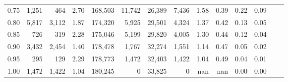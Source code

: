 \begin{tabular}{rrrrrrrrrrrrrr}
0.75 &   1,251 &    464 &    2.70 &  168,503 &   11,742 &  26,389 &   7,436 &  1.58 &  0.39 &  0.22 &      0.09 \\
0.80 &   5,817 &  3,112 &    1.87 &  174,320 &    5,925 &  29,501 &   4,324 &  1.37 &  0.42 &  0.13 &      0.05 \\
0.85 &     726 &    319 &    2.28 &  175,046 &    5,199 &  29,820 &   4,005 &  1.30 &  0.44 &  0.12 &      0.04 \\
0.90 &   3,432 &  2,454 &    1.40 &  178,478 &    1,767 &  32,274 &   1,551 &  1.14 &  0.47 &  0.05 &      0.02 \\
0.95 &     295 &    129 &    2.29 &  178,773 &    1,472 &  32,403 &   1,422 &  1.04 &  0.49 &  0.04 &      0.01 \\
1.00 &   1,472 &  1,422 &    1.04 &  180,245 &        0 &  33,825 &       0 &   nan &   nan &  0.00 &      0.00 \\
\bottomrule
\end{tabular}
